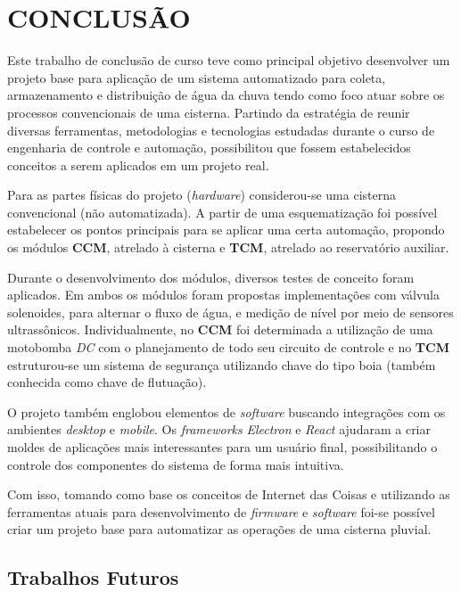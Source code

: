 
\chapter{CONCLUSÃO}
\label{chap:conclusao}

Este trabalho de conclusão de curso teve como principal objetivo desenvolver um projeto base para aplicação de um sistema automatizado para coleta, armazenamento e distribuição de água da chuva tendo como foco atuar sobre os processos convencionais de uma cisterna. Partindo da estratégia de reunir diversas ferramentas, metodologias e tecnologias estudadas durante o curso de engenharia de controle e automação, possibilitou que fossem estabelecidos conceitos a serem aplicados em um projeto real.

Para as partes físicas do projeto (\textit{hardware}) considerou-se uma cisterna convencional (não automatizada). A partir de uma esquematização foi possível estabelecer os pontos principais para se aplicar uma certa automação, propondo os módulos \textbf{CCM}, atrelado à cisterna e \textbf{TCM}, atrelado ao reservatório auxiliar.

Durante o desenvolvimento dos módulos, diversos testes de conceito foram aplicados. Em ambos os módulos foram propostas implementações com válvula solenoides, para alternar o fluxo de água, e medição de nível por meio de sensores ultrassônicos. Individualmente, no \textbf{CCM} foi determinada a utilização de uma motobomba \textit{DC} com o planejamento de todo seu circuito de controle e no \textbf{TCM} estruturou-se um sistema de segurança utilizando chave do tipo boia (também conhecida como chave de flutuação).

O projeto também englobou elementos de \textit{software} buscando integrações com os ambientes \textit{desktop} e \textit{mobile}. Os \textit{frameworks} \textit{Electron} e \textit{React} ajudaram a criar moldes de aplicações mais interessantes para um usuário final, possibilitando o controle dos componentes do sistema de forma mais intuitiva.

Com isso, tomando como base os conceitos de Internet das Coisas e utilizando as ferramentas atuais para desenvolvimento de \textit{firmware} e \textit{software} foi-se possível criar um projeto base para automatizar as operações de uma cisterna pluvial.

\section{Trabalhos Futuros}
\label{sec:trabalhosFuturos}

